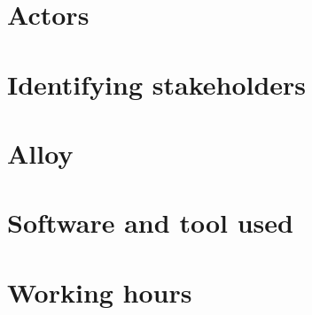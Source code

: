 \documentclass[]{report}
\begin{document}
\section{Actors}


\section{Identifying stakeholders}


\section{Alloy}


\section{Software and tool used}


\section{Working hours}

\end{document}
